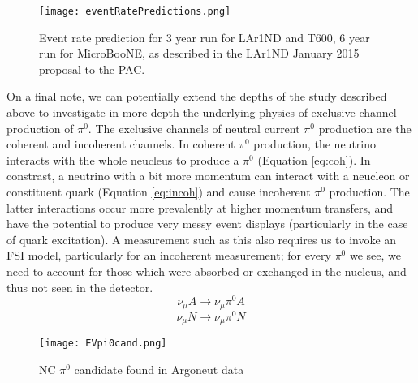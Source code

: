 \documentclass[12pt]{article}
\begin{document}
\begin{figure}[h!]
\centering
\texttt{[image: eventRatePredictions.png]}
\caption{Event rate prediction for 3 year run for LAr1ND and T600, 6 year run for MicroBooNE, as described in the LAr1ND January 2015 proposal to the PAC.}
\end{figure}
\par On a final note, we can potentially extend the depths of the study described above to investigate in more depth the underlying physics of exclusive channel production of $\pi^0$. The exclusive channels of neutral current $\pi^0$ production are the coherent and incoherent channels.  In coherent $\pi^0$ production, the neutrino interacts with the whole neucleus to produce a $\pi^0$ (Equation \ref{eq:coh}). In constrast, a neutrino with a bit more momentum can interact with a neucleon or constituent quark (Equation \ref{eq:incoh}) and cause incoherent $\pi^0$ production. The latter interactions occur more prevalently at higher momentum transfers, and have the potential to produce very messy event displays (particularly in the case of quark excitation). A measurement such as this also requires us to invoke an FSI model, particularly for an incoherent measurement; for every $\pi^0$ we see, we need to account for those which were absorbed or exchanged in the nucleus, and thus not seen in the detector.  
\begin{equation} \label{eq:coh}
\nu_\mu A \rightarrow \nu_\mu \pi^0 A 
\end{equation}
\begin{equation} \label{eq:incoh}
\nu_\mu N \rightarrow \nu_\mu \pi^0 N
\end{equation}

\begin{figure}[h!]
\centering
\texttt{[image: EVpi0cand.png]}
\caption{NC $\pi^0$ candidate found in Argoneut data}
\end{figure}

\newpage
\appendix
\end{document}
